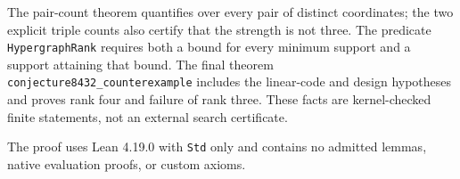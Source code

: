 \documentclass[11pt]{article}
\begin{document}
The pair-count theorem quantifies over every pair of distinct coordinates;
the two explicit triple counts also certify that the strength is not three.
The predicate \texttt{HypergraphRank} requires both a bound for every minimum
support and a support attaining that bound. The final theorem
\texttt{conjecture8432\_counterexample} includes the linear-code and design
hypotheses and proves rank four and failure of rank three. These facts are
kernel-checked finite statements, not an external search certificate.

The proof uses Lean 4.19.0 with \texttt{Std} only and contains no admitted
lemmas, native evaluation proofs, or custom axioms.
\end{document}
